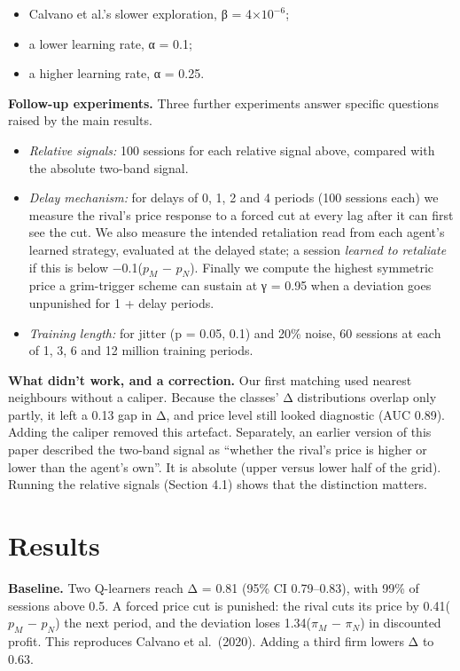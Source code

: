 \documentclass[11pt,a4paper]{article}
\providecommand{\tightlist}{\setlength{\itemsep}{1pt}\setlength{\parskip}{0pt}}
\begin{document}
\begin{itemize}
\tightlist
\item
  Calvano et al.'s slower exploration, β = 4×\(10^{-6}\);
\item
  a lower learning rate, α = 0.1;
\item
  a higher learning rate, α = 0.25.
\end{itemize}

\textbf{Follow-up experiments.} Three further experiments answer specific questions raised by the main results.

\begin{itemize}
\tightlist
\item
  \emph{Relative signals:} 100 sessions for each relative signal above, compared with the absolute two-band signal.
\item
  \emph{Delay mechanism:} for delays of 0, 1, 2 and 4 periods (100 sessions each) we measure the rival's price response to a forced cut at every lag after it can first see the cut. We also measure the intended retaliation read from each agent's learned strategy, evaluated at the delayed state; a session \emph{learned to retaliate} if this is below −0.1(\(p_{M}\) − \(p_{N}\)). Finally we compute the highest symmetric price a grim-trigger scheme can sustain at γ = 0.95 when a deviation goes unpunished for 1 + delay periods.
\item
  \emph{Training length:} for jitter (p = 0.05, 0.1) and 20\% noise, 60 sessions at each of 1, 3, 6 and 12 million training periods.
\end{itemize}

\textbf{What didn't work, and a correction.} Our first matching used nearest neighbours without a caliper. Because the classes' Δ distributions overlap only partly, it left a 0.13 gap in Δ, and price level still looked diagnostic (AUC 0.89). Adding the caliper removed this artefact. Separately, an earlier version of this paper described the two-band signal as ``whether the rival's price is higher or lower than the agent's own''. It is absolute (upper versus lower half of the grid). Running the relative signals (Section 4.1) shows that the distinction matters.

\hypertarget{results}{%
\section{Results}\label{results}}

\textbf{Baseline.} Two Q-learners reach Δ = 0.81 (95\% CI 0.79--0.83), with 99\% of sessions above 0.5. A forced price cut is punished: the rival cuts its price by 0.41(\(p_{M}\) − \(p_{N}\)) the next period, and the deviation loses 1.34(\(π_{M}\) − \(π_{N}\)) in discounted profit. This reproduces Calvano et al.~(2020). Adding a third firm lowers Δ to 0.63.
\end{document}
